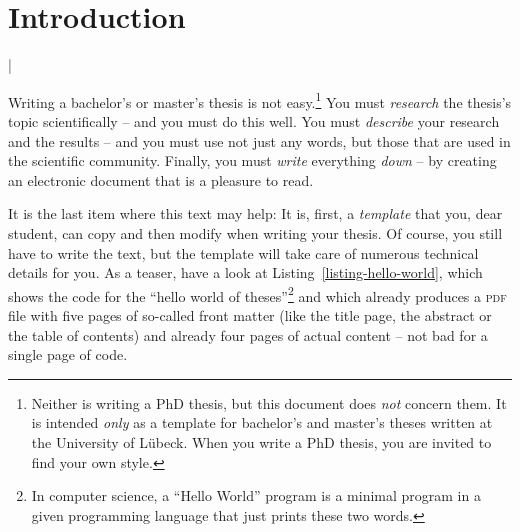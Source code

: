 \documentclass[english,version-2020-11]{uzl-thesis}
\begin{document}
%
%


\chapter{Introduction}


%

\lstMakeShortInline[style=code,style=inline,language={[LaTeX]tex},moretexcs={chapter}]|

Writing a bachelor's or master's thesis is not easy.\footnote{Neither
  is writing a PhD thesis, but this document does \emph{not} concern
  them. It is intended \emph{only} as a template for bachelor's and
  master's theses written at the University of Lübeck. When you write
  a PhD thesis, you are invited to find your own style.} You must
\emph{research} the thesis's topic scientifically 
-- and you must do 
this well. You must \emph{describe} your research and the results --
and you must use not just any words, but those that are used in the
scientific community. Finally, you must \emph{write} everything
\emph{down} -- by creating an electronic document that is a pleasure
to read.

It is the last item where this text may help: It is, first, a
\emph{template} that you, dear student, can copy and then modify when
writing your thesis. Of course, you still have to write the text, but
the template will take care of numerous technical details for you. As
a teaser, have a look at Listing~\vref{listing-hello-world}, which 
shows the code for the ``hello world of theses''\footnote{In computer
  science, a ``Hello World'' program is a minimal program in a given
  programming language that   just prints these two words.} and which
already produces a \textsc{pdf} file with five pages of so-called front
matter (like the title page, the abstract or the table of contents)
and already four pages of actual content -- not bad for a single page
of code.
\end{document}
